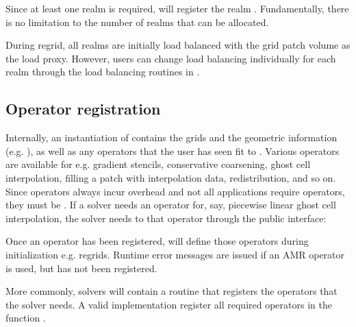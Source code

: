 \documentclass[letterpaper,10pt,english]{sphinxmanual}
\begin{document}
\sphinxAtStartPar
Since at least one realm is required,  will  register the realm .
Fundamentally, there is no limitation to the number of realms that can be allocated.

\sphinxAtStartPar
During regrid, all realms are initially load balanced with the grid patch volume as the load proxy.
However, users can change load balancing individually for each realm through the load balancing routines in {\hyperref[\detokenize{Source/TimeStepper:chap-timestepper}]{}}.


\subsection{Operator registration}
\label{\detokenize{Source/Realm:operator-registration}}
\sphinxAtStartPar
Internally, an instantiation of  contains the grids and the geometric information (e.g. ), as well as any operators that the user has seen fit to .
Various operators are available for e.g. gradient stencils, conservative coarsening, ghost cell interpolation, filling a patch with interpolation data, redistribution, and so on.
Since operators always incur overhead and not all applications require  operators, they must be .
If a solver needs an operator for, say, piecewise linear ghost cell interpolation, the solver needs to  that operator through the  public interface:

\begin{sphinxVerbatim}[commandchars=\\\{\},formatcom=\scriptsize]
  
\end{sphinxVerbatim}

\sphinxAtStartPar
Once an operator has been registered,  will define those operators during initialization e.g. regrids.
Run\sphinxhyphen{}time error messages are issued if an AMR operator is used, but has not been registered.

\sphinxAtStartPar
More commonly,  solvers will contain a routine that registers the operators that the solver needs.
A valid  implementation  register all required operators in the function .
\end{document}
